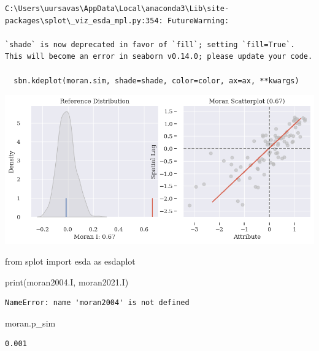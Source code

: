\documentclass[
  letterpaper,
  DIV=11,
  numbers=noendperiod]{scrreprt}
\newenvironment{Shaded}{\begin{snugshade}}{\end{snugshade}}
\newcommand{\BuiltInTok}[1]{\textcolor[rgb]{0.00,0.23,0.31}{#1}}
\newcommand{\ImportTok}[1]{\textcolor[rgb]{0.00,0.46,0.62}{#1}}
\newcommand{\NormalTok}[1]{\textcolor[rgb]{0.00,0.23,0.31}{#1}}
\begin{document}
\begin{verbatim}
C:\Users\uursavas\AppData\Local\anaconda3\Lib\site-packages\splot\_viz_esda_mpl.py:354: FutureWarning: 

`shade` is now deprecated in favor of `fill`; setting `fill=True`.
This will become an error in seaborn v0.14.0; please update your code.

  sbn.kdeplot(moran.sim, shade=shade, color=color, ax=ax, **kwargs)
\end{verbatim}

\includegraphics{labs/dani_style_informal_files/figure-pdf/cell-15-output-2.png}

\begin{Shaded}
\begin{Highlighting}[]
\ImportTok{from}\NormalTok{ splot }\ImportTok{import}\NormalTok{ esda }\ImportTok{as}\NormalTok{ esdaplot}
\end{Highlighting}
\end{Shaded}

\begin{Shaded}
\begin{Highlighting}[]
\BuiltInTok{print}\NormalTok{(moran2004.I, moran2021.I)}
\end{Highlighting}
\end{Shaded}

\begin{verbatim}
NameError: name 'moran2004' is not defined
\end{verbatim}

\begin{Shaded}
\begin{Highlighting}[]
\NormalTok{moran.p\_sim}
\end{Highlighting}
\end{Shaded}

\begin{verbatim}
0.001
\end{verbatim}
\end{document}
